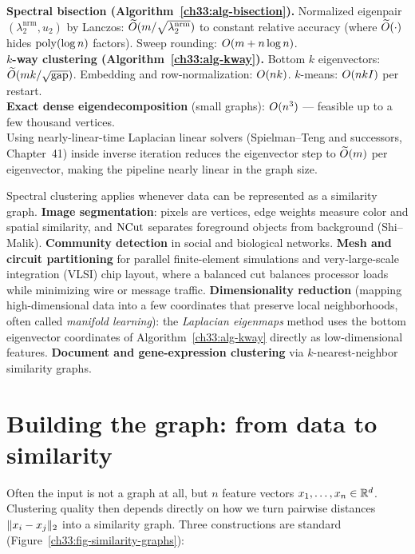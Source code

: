 \begin{complexitybox}
\textbf{Spectral bisection (Algorithm~\ref{ch33:alg-bisection}).} Normalized eigenpair $(\lambda_2^{\mathrm{nrm}},u_2)$ by Lanczos:
$\widetilde{O}(m / \sqrt{\lambda_2^{\mathrm{nrm}}})$ to constant relative accuracy (where $\widetilde{O}(\cdot)$ hides $\operatorname{poly}(\log n)$ factors). Sweep rounding: $O(m + n\log n)$.
\\[3pt]
\textbf{$k$-way clustering (Algorithm~\ref{ch33:alg-kway}).} Bottom $k$ eigenvectors: $\widetilde{O}(mk/\sqrt{\mathrm{gap}})$.
Embedding and row-normalization: $O(nk)$. $k$-means: $O(nkI)$ per restart.
\\[3pt]
\textbf{Exact dense eigendecomposition} (small graphs): $O(n^3)$ --- feasible up to a few thousand vertices.
\\[3pt]
Using nearly-linear-time Laplacian linear solvers (Spielman--Teng and successors, Chapter~41) inside inverse iteration reduces the eigenvector step to
$\widetilde{O}(m)$ per eigenvector, making the pipeline nearly linear in the graph size.
\end{complexitybox}

\begin{applicationbox}
Spectral clustering applies whenever data can be represented as a similarity graph. \textbf{Image segmentation}: pixels are
vertices, edge weights measure color and spatial similarity, and $\operatorname{NCut}$ separates foreground objects from background (Shi--Malik).
\textbf{Community detection} in social and biological networks. \textbf{Mesh and circuit partitioning} for
parallel finite-element simulations and very-large-scale integration (VLSI) chip layout, where a balanced cut balances processor loads while minimizing wire or message traffic.
\textbf{Dimensionality reduction} (mapping high-dimensional data into a few coordinates that preserve local neighborhoods, often called \emph{manifold learning}): the \emph{Laplacian eigenmaps} method uses the bottom eigenvector coordinates of Algorithm~\ref{ch33:alg-kway} directly as low-dimensional features. \textbf{Document and gene-expression clustering} via
$k$-nearest-neighbor similarity graphs.
\end{applicationbox}

\section{Building the graph: from data to similarity}
\label{ch33:graph-construction}

Often the input is not a graph at all, but $n$ feature vectors $x_1,\dots,x_n \in \mathbb{R}^d$. Clustering quality then depends directly on
how we turn pairwise distances $\lVert x_i - x_j\rVert_2$ into a similarity graph. Three constructions are standard (Figure~\ref{ch33:fig-similarity-graphs}):

